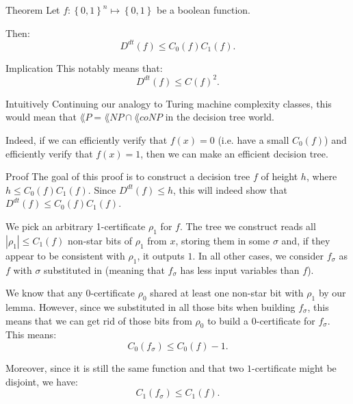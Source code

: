 \documentclass[a4paper]{article}
\begin{document}
\begin{parag}{Theorem}
    Let $f: \left\{0, 1\right\}^n \mapsto \left\{0, 1\right\}$ be a boolean function.

    Then: 
    \[D^{dt}\left(f\right) \leq C_0\left(f\right) C_1\left(f\right).\]

    \begin{subparag}{Implication}
        This notably means that: 
        \[D^{dt}\left(f\right) \leq C\left(f\right)^2.\]
    \end{subparag}

    \begin{subparag}{Intuitively}
        Continuing our analogy to Turing machine complexity classes, this would mean that $\lang{P} = \lang{NP} \cap \lang{coNP}$ in the decision tree world.

        Indeed, if we can efficiently verify that $f\left(x\right) = 0$ (i.e. have a small $C_0\left(f\right)$) and efficiently verify that $f\left(x\right) = 1$, then we can make an efficient decision tree.
    \end{subparag}
   
    \begin{subparag}{Proof}
        The goal of this proof is to construct a decision tree $f$ of height $h$, where $h \leq C_0\left(f\right) C_1\left(f\right)$. Since $D^{dt}\left(f\right) \leq h$, this will indeed show that $D^{dt}\left(f\right) \leq C_0\left(f\right)C_1\left(f\right)$.

        We pick an arbitrary 1-certificate $\rho_1$ for $f$. The tree we construct reads all $\left|\rho_1\right| \leq C_1\left(f\right)$ non-star bits of $\rho_1$ from $x$, storing them in some $\sigma$ and, if they appear to be consistent with $\rho_1$, it outputs $1$. In all other cases, we consider $f_{\sigma}$ as $f$ with $\sigma$ substituted in (meaning that $f_{\sigma}$ has less input variables than $f$).

        We know that any 0-certificate $\rho_0$ shared at least one non-star bit with $\rho_1$ by our lemma. However, since we substituted in all those bits when building $f_{\sigma}$, this means that we can get rid of those bits from $\rho_0$ to build a 0-certificate for $f_{\sigma}$. This means: 
        \[C_0\left(f_{\sigma}\right) \leq C_0\left(f\right) - 1.\]
        
        Moreover, since it is still the same function and that two $1$-certificate might be disjoint, we have: 
        \[C_1\left(f_{\sigma}\right) \leq C_1\left(f\right).\]


\end{subparag}
\end{parag}
\end{document}

